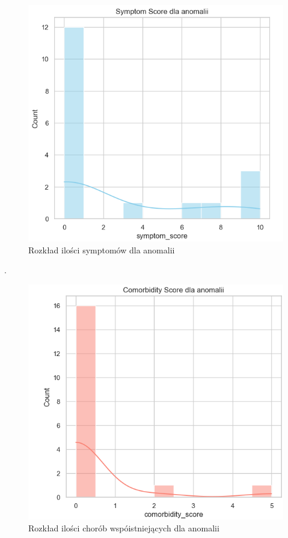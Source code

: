 \documentclass[a4paper,fleqn]{cas-dc}
\begin{document}
\begin{figure}[h]
	\includegraphics[scale=.70]{wykresy/wykres2.1.png}
	\caption{Rozkład ilości symptomów dla anomalii}
	\label{FIG:1}
\end{figure}
\newpage
.
\newpage
\begin{figure}[h]
	\includegraphics[scale=.60]{wykresy/wykres2.2.png}
	\caption{ Rozkład ilości chorób wspóistniejących dla anomalii}
	\label{FIG:1}
\end{figure}
\end{document}
